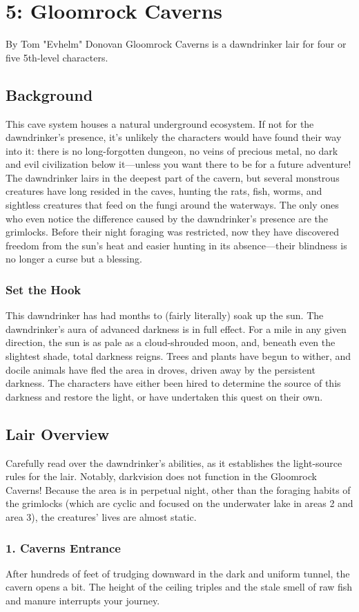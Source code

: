 \documentclass[10pt,a4paper,twoside,twocolumn,openany,bg=print,nodeprecatedcode]{dndbook}
\begin{document}
\chapter{5: Gloomrock Caverns}
By Tom "Evhelm" Donovan
Gloomrock Caverns is a dawndrinker lair for four or five 5th-level characters.
\section{Background}
This cave system houses a natural underground ecosystem. If not for the dawndrinker's presence, it's unlikely the characters would have found their way into it: there is no long-forgotten dungeon, no veins of precious metal, no dark and evil civilization below it—unless you want there to be for a future adventure!
The dawndrinker lairs in the deepest part of the cavern, but several monstrous creatures have long resided in the caves, hunting the rats, fish, worms, and sightless creatures that feed on the fungi around the waterways. The only ones who even notice the difference caused by the dawndrinker's presence are the grimlocks. Before their night foraging was restricted, now they have discovered freedom from the sun's heat and easier hunting in its absence—their blindness is no longer a curse but a blessing.
\subsection{Set the Hook}
This dawndrinker has had months to (fairly literally) soak up the sun. The dawndrinker's aura of advanced darkness is in full effect. For a mile in any given direction, the sun is as pale as a cloud-shrouded moon, and, beneath even the slightest shade, total darkness reigns. Trees and plants have begun to wither, and docile animals have fled the area in droves, driven away by the persistent darkness. The characters have either been hired to determine the source of this darkness and restore the light, or have undertaken this quest on their own.
\section{Lair Overview}
Carefully read over the dawndrinker's abilities, as it establishes the light-source rules for the lair. Notably, darkvision does not function in the Gloomrock Caverns! Because the area is in perpetual night, other than the foraging habits of the grimlocks (which are cyclic and focused on the underwater lake in areas 2 and area 3), the creatures' lives are almost static.
\subsection{1. Caverns Entrance}
\begin{DndReadAloud}{}
After hundreds of feet of trudging downward in the dark and uniform tunnel, the cavern opens a bit. The height of the ceiling triples and the stale smell of raw fish and manure interrupts your journey.
\end{DndReadAloud}
\end{document}
